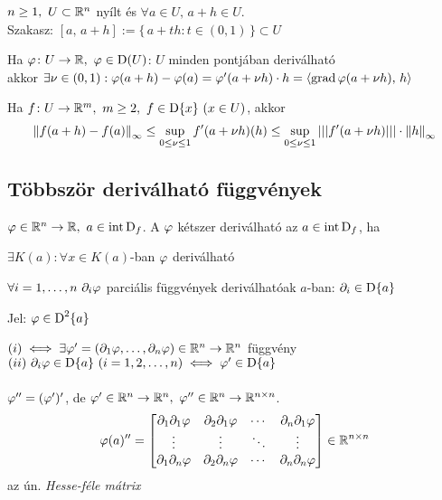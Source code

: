 \begin{te}
  $n\geq1,~U\subset\mathbb{R}^n$ nyílt és $\forall a\in U,\,a+h\in U$.\\
  Szakasz: $[a,\,a+h] := \{\,a+th:t\in(0,1)\,\}\subset U$
    \begin{enumzjb}
    \item Ha $\vfi\colon U\n\R,\ \vfi\in\D(U)$: $U$ minden pontjában deriválható\\
      akkor $\exists \nu\in(0,1):\varphi(a+h)-\varphi(a)=\varphi'(a+\nu h)\cdot h=\langle\operatorname{grad}\varphi(a+\nu h),\,h\rangle$
    \item Ha $f\colon U\n\R^m,\ m\geq2,\ f\in\der{x}\ (x\in U)$, akkor
      \[ \left\Vert f(a+h)-f(a)\right\Vert_\infty\leq \displaystyle\sup_{0\leq\nu\leq1} f'(a+\nu h)(h) \leq
      \sup_{0\leq\nu\leq1}|||f'(a+\nu h)|||\cdot \left\Vert h\right\Vert_\infty\]
    \end{enumzjb}  
\end{te}

\subsection{Többször deriválható függvények}
\begin{de}
  $\varphi\in\mathbb{R}^n\to\mathbb{R},\ a\in\operatorname{int\,D}_f$. A $\varphi$ kétszer deriválható az $a\in\operatorname{int\,D}_f$, ha
    \begin{enumzjr}
    \item $\exists K(a)\colon \forall x\in K(a)$-ban $\varphi$ deriválható
    \item $\forall i=1,\dotsc,n\ \partial_i\vfi$ parciális függvények deriválhatóak $a$-ban: $\partial_i\in\operatorname{D}\{a\}$
    \end{enumzjr}
  Jel: $\varphi \in\operatorname{D}^{2}\{a\}$
\end{de}
\begin{megj}
  $(i) \iff \exists\varphi'=(\partial_1\varphi,\dotsc,\partial_n\varphi)\in\mathbb{R}^n\to\mathbb{R}^n$ függvény\\
  $(ii)\ \partial_i\vfi\in\der{a}\ (i=1,2,\dotsc,n) \ekviv \vfi'\in\der{a}$\\\\
  $\varphi'' = (\varphi')'$, de $\varphi'\in\mathbb{R}^n\to\mathbb{R}^n,\ \varphi''\in\mathbb{R}^n\to\mathbb{R}^{n\times n}$.\\
  \[\varphi(a)'' = \begin{bmatrix}
  \partial_1\partial_1\varphi &\partial_2\partial_1\varphi & \cdots & \partial_n\partial_1\varphi \\
  \vdots & \vdots & \ddots & \vdots \\
  \partial_1\partial_n\varphi &\partial_2\partial_n\varphi & \cdots & \partial_n\partial_n\varphi 
  \end{bmatrix}\in\mathbb{R}^{n\times n}\]
  az ún. \emph{Hesse-féle mátrix}  
\end{megj}

